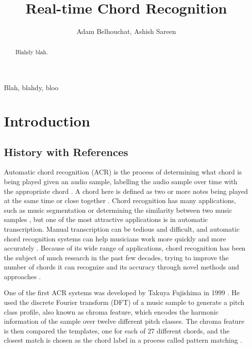 \documentclass[journal]{IEEEtran}
\begin{document}
\title{Real-time Chord Recognition}
\author{Adam Belhouchat, Ashish Sareen}
\maketitle

\begin{abstract}
    Blahdy blah.
\end{abstract}
\begin{IEEEkeywords}
    Blah, blahdy, bloo
\end{IEEEkeywords}

\section{Introduction}
\subsection{History with References}
Automatic chord recognition (ACR) is the process of determining what chord is being played given an audio sample, labelling the audio sample over time with the appropriate chord \cite{stark}.
A chord here is defined as two or more notes being played at the same time or close together \cite{cho}.
Chord recognition has many applications, such as music segmentation or determining the similarity between two music samples \cite{lee}, but one of the most attractive applications is in automatic transcription.
Manual transcription can be tedious and difficult, and automatic chord recognition systems can help musicians work more quickly and more accurately \cite{mauch_thesis}.
Because of its wide range of applications, chord recognition has been the subject of much research in the past few decades, trying to improve the number of chords it can recognize and its accuracy through novel methods and approaches \cite{pauwels}.

One of the first ACR systems was developed by Takuya Fujishima in 1999 \cite{pauwels}.
He used the discrete Fourier transform (DFT) of a music sample to generate a pitch class profile, also known as chroma feature, which encodes the harmonic information of the sample over twelve different pitch classes.
The chroma feature is then compared the templates, one for each of 27 different chords, and the closest match is chosen as the chord label in a process called pattern matching \cite{fujishima}.
\end{document}
